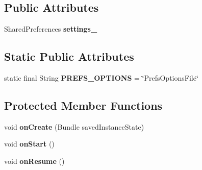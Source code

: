 \subsection*{Public Attributes}
\begin{DoxyCompactItemize}
\item 
\hypertarget{classcom_1_1client_1_1mobii_1_1_mobii_activity_a7e3ad0cd7f178f453ee0d6ee32bf1b4d}{Shared\-Preferences {\bfseries settings\-\_\-}}\label{classcom_1_1client_1_1mobii_1_1_mobii_activity_a7e3ad0cd7f178f453ee0d6ee32bf1b4d}

\end{DoxyCompactItemize}
\subsection*{Static Public Attributes}
\begin{DoxyCompactItemize}
\item 
\hypertarget{classcom_1_1client_1_1mobii_1_1_mobii_activity_a02bdf684be889c89cc14ba8c7348df0f}{static final String {\bfseries P\-R\-E\-F\-S\-\_\-\-O\-P\-T\-I\-O\-N\-S} = \char`\"{}Prefs\-Options\-File\char`\"{}}\label{classcom_1_1client_1_1mobii_1_1_mobii_activity_a02bdf684be889c89cc14ba8c7348df0f}

\end{DoxyCompactItemize}
\subsection*{Protected Member Functions}
\begin{DoxyCompactItemize}
\item 
\hypertarget{classcom_1_1client_1_1mobii_1_1_mobii_activity_a0ea608a330e558641d77e79cbcea40c3}{void {\bfseries on\-Create} (Bundle saved\-Instance\-State)}\label{classcom_1_1client_1_1mobii_1_1_mobii_activity_a0ea608a330e558641d77e79cbcea40c3}

\item 
\hypertarget{classcom_1_1client_1_1mobii_1_1_mobii_activity_a21d8446ff7af0a766ad8093dc2e599cf}{void {\bfseries on\-Start} ()}\label{classcom_1_1client_1_1mobii_1_1_mobii_activity_a21d8446ff7af0a766ad8093dc2e599cf}

\item 
\hypertarget{classcom_1_1client_1_1mobii_1_1_mobii_activity_a75ad20570c063dc8b6f736a308f35aae}{void {\bfseries on\-Resume} ()}\label{classcom_1_1client_1_1mobii_1_1_mobii_activity_a75ad20570c063dc8b6f736a308f35aae}

\end{DoxyCompactItemize}


